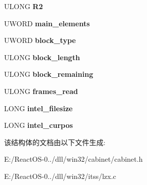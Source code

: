 \begin{DoxyCompactItemize}
U\+L\+O\+NG {\bfseries R2}
\item 
\mbox{\label{struct_l_z_xstate_a37bcbc20b5214591aa0e17a71e40f934}} 
U\+W\+O\+RD {\bfseries main\+\_\+elements}
\item 
\mbox{\label{struct_l_z_xstate_a66f5ff04b1a5e259578d05ac0a1caae2}} 
U\+W\+O\+RD {\bfseries block\+\_\+type}
\item 
\mbox{\label{struct_l_z_xstate_ae18d61cb6d2ee52cb0b431e4a12e6145}} 
U\+L\+O\+NG {\bfseries block\+\_\+length}
\item 
\mbox{\label{struct_l_z_xstate_a1bb8a96bd4f51754f92452b4d85343d7}} 
U\+L\+O\+NG {\bfseries block\+\_\+remaining}
\item 
\mbox{\label{struct_l_z_xstate_a8bf4e7cd70427286c9e9b4f8b6446e6f}} 
U\+L\+O\+NG {\bfseries frames\+\_\+read}
\item 
\mbox{\label{struct_l_z_xstate_a44996e1636d7112af6051b38a379b656}} 
L\+O\+NG {\bfseries intel\+\_\+filesize}
\item 
\mbox{\label{struct_l_z_xstate_a4c82a93d0690070178a128060aef27d0}} 
L\+O\+NG {\bfseries intel\+\_\+curpos}
\end{DoxyCompactItemize}


该结构体的文档由以下文件生成\+:\begin{DoxyCompactItemize}
\item 
E\+:/\+React\+O\+S-\/0../dll/win32/cabinet/cabinet.\+h\item 
E\+:/\+React\+O\+S-\/0../dll/win32/itss/lzx.\+c\end{DoxyCompactItemize}
